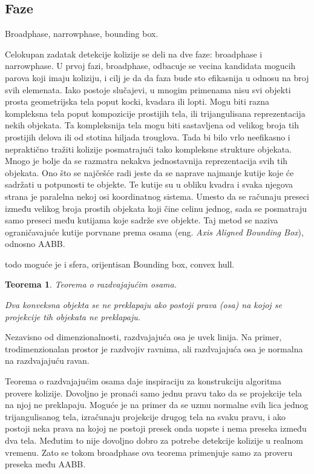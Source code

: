 \documentclass{article}
\newtheorem{teo}{Teorema}[section]
\begin{document}
{\subsection{Faze}
Broadphase, narrowphase, bounding box.

Celokupan zadatak detekcije kolizije se deli na dve faze: broadphase i narrowphase. 
U prvoj fazi, broadphase, odbacuje se vecina kandidata mogucih parova koji imaju koliziju, i cilj je da 
da faza bude sto efikasnija u odnosu na broj svih elemenata.
Iako postoje slučajevi, u mnogim primenama nisu svi objekti prosta geometrijska tela poput kocki, kvadara ili lopti.
Mogu biti razna kompleksna tela poput kompozicije prostijih tela, ili trijangulisana reprezentacija 
nekih objekata. Ta kompleksnija tela mogu biti sastavljena od velikog broja tih prostijih delova ili
od stotina hiljada trouglova. Tada bi bilo vrlo neefikasno i nepraktično tražiti kolizije posmatrajući
tako kompleksne strukture objekata. Mnogo je bolje da se razmatra nekakva jednostavnija reprezentacija svih 
tih objekata. Ono što se najčešće radi jeste da se naprave najmanje kutije koje će sadržati u potpunosti te objekte.
Te kutije su u obliku kvadra i svaka njegova strana je paralelna nekoj osi koordinatnog sistema. 
Umesto da se računaju preseci između velikog broja prostih objekata koji čine celinu jednog, sada se posmatraju 
samo preseci među kutijama koje sadrže sve objekte. Taj metod se naziva ograničavajuće kutije
porvnane prema osama (eng. {\em Axis Aligned Bounding Box}), odnosno AABB.

todo moguće je i sfera, orijentisan Bounding box, convex hull.

\begin{teo}
	Teorema o razdvajajućim osama. 

	Dva konveksna objekta se ne preklapaju ako postoji prava (osa) na kojoj se projekcije 
	tih objekata ne preklapaju. 
\end{teo}
Nezavisno od dimenzionalnosti, razdvajajuća osa je uvek linija. Na primer, trodimenzionalan prostor
je razdvojiv ravnima, ali razdvajajuća osa je normalna na razdvajajuću ravan.

Teorema o razdvajajućim osama daje inspiraciju za konstrukciju algoritma provere kolizije.
Dovoljno je pronaći samo jednu pravu tako da se  projekcije tela na njoj ne preklapaju.
Moguće je na primer da se uzmu normalne svih lica jednog trijangulisanog tela, izračunaju projekcije drugog 
tela na svaku pravu, i ako postoji neka prava na kojoj ne postoji presek onda uopste i nema preseka između
dva tela. Međutim to nije dovoljno dobro za potrebe detekcije kolizije u realnom vremenu. Zato se tokom 
broadphase ova teorema primenjuje samo za proveru preseka među AABB.

}
\end{document}
